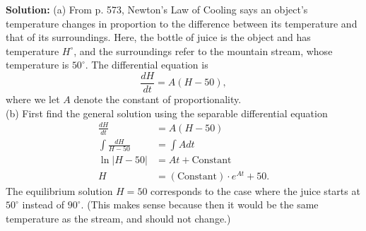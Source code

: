 \documentclass[11pt,letterpaper]{article}
\begin{document}
\begin{enumerate}
{\bf Solution:} (a) From p. 573, Newton's Law of Cooling says an object's temperature changes in proportion to the difference between its temperature and that of its surroundings.  Here, the bottle of juice is the object and has temperature $H^{\circ}$, and the surroundings refer to the mountain stream, whose temperature is $50^{\circ}$.  The differential equation is
\[\frac{dH}{dt}=A(H-50),\]
where we let $A$ denote the constant of proportionality. \\    
(b) First find the general solution using the separable differential equation
\begin{align*}
\frac{dH}{dt} &=A(H-50) \\
\int\frac{dH}{H-50} &= \int Adt \\
\ln|H-50| &=At+\text{Constant} \\
H &=(\text{Constant})\cdot e^{At}+50.
\end{align*}
The equilibrium solution $H=50$ corresponds to the case where the juice starts at $50^{\circ}$ instead of $90^{\circ}$.  (This makes sense because then it would be the same temperature as the stream, and should not change.)  


\end{enumerate}
\end{document}

